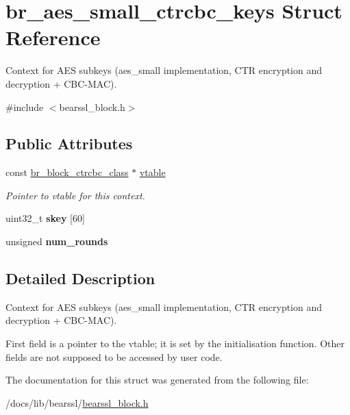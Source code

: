 \hypertarget{structbr__aes__small__ctrcbc__keys}{}\section{br\+\_\+aes\+\_\+small\+\_\+ctrcbc\+\_\+keys Struct Reference}
\label{structbr__aes__small__ctrcbc__keys}


Context for A\+ES subkeys ({\ttfamily aes\+\_\+small} implementation, C\+TR encryption and decryption + C\+B\+C-\/\+M\+AC).  




{\ttfamily \#include $<$bearssl\+\_\+block.\+h$>$}

\subsection*{Public Attributes}
\begin{DoxyCompactItemize}
\item 
\mbox{\label{structbr__aes__small__ctrcbc__keys_a40295e5bdc9dfefe294f55bf36b6cbaa}} 
const \hyperlink{bearssl__block_8h_acc35dad952fda67b68df0b107fe26f0b}{br\+\_\+block\+\_\+ctrcbc\+\_\+class} $\ast$ \hyperlink{structbr__aes__small__ctrcbc__keys_a40295e5bdc9dfefe294f55bf36b6cbaa}{vtable}
\begin{DoxyCompactList}\small\item\em Pointer to vtable for this context. \end{DoxyCompactList}\item 
\mbox{\label{structbr__aes__small__ctrcbc__keys_a8dda1c7b259b965cef47a1b1a2562f1b}} 
uint32\+\_\+t {\bfseries skey} \mbox{[}60\mbox{]}
\item 
\mbox{\label{structbr__aes__small__ctrcbc__keys_af6b95a75d4d654baa63d4976e47df3e2}} 
unsigned {\bfseries num\+\_\+rounds}
\end{DoxyCompactItemize}


\subsection{Detailed Description}
Context for A\+ES subkeys ({\ttfamily aes\+\_\+small} implementation, C\+TR encryption and decryption + C\+B\+C-\/\+M\+AC). 

First field is a pointer to the vtable; it is set by the initialisation function. Other fields are not supposed to be accessed by user code. 

The documentation for this struct was generated from the following file\+:\begin{DoxyCompactItemize}
\item 
/docs/lib/bearssl/\hyperlink{bearssl__block_8h}{bearssl\+\_\+block.\+h}\end{DoxyCompactItemize}
